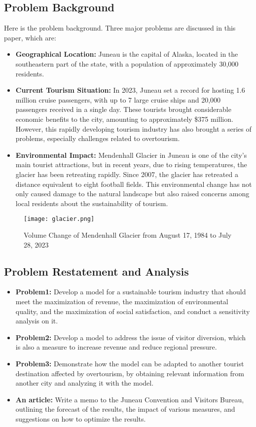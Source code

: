 \documentclass[12pt]{article}  %
\begin{document}
\subsection{Problem Background}
Here is the problem background. Three major problems are discussed in this paper, which are:
\begin{itemize}
    \item \textbf{Geographical Location: }Juneau is the capital of Alaska, located in the southeastern part of the state, with a population of approximately 30,000 residents. 
    \item \textbf{Current Tourism Situation: }In 2023, Juneau set a record for hosting 1.6 million cruise passengers, with up to 7 large cruise ships and 20,000 passengers received in a single day.\cite{1} These tourists brought considerable economic benefits to the city, amounting to approximately \$375 million.\cite{2} However, this rapidly developing tourism industry has also brought a series of problems, especially challenges related to overtourism.
    \item \textbf{Environmental Impact: }Mendenhall Glacier in Juneau is one of the city's main tourist attractions, but in recent years, due to rising temperatures, the glacier has been retreating rapidly. Since 2007, the glacier has retreated a distance equivalent to eight football fields. This environmental change has not only caused damage to the natural landscape but also raised concerns among local residents about the sustainability of tourism.\cite{3}
\end{itemize}

\begin{figure}[H]
	\centering
	\texttt{[image: glacier.png]}
	\caption{Volume Change of Mendenhall Glacier from August 17, 1984 to July 28, 2023}\label{fig:glacier}
\end{figure}

\subsection{Problem Restatement and Analysis}
\begin{itemize}
    \item \textbf{Problem1: }Develop a model for a sustainable tourism industry that should meet the maximization of revenue, the maximization of environmental quality, and the maximization of social satisfaction, and conduct a sensitivity analysis on it.
    \item \textbf{Problem2: }Develop a model to address the issue of visitor diversion, which is also a measure to increase revenue and reduce regional pressure.
    \item \textbf{Problem3: }Demonstrate how the model can be adapted to another tourist destination affected by overtourism, by obtaining relevant information from another city and analyzing it with the model.
    \item \textbf{An article: }Write a memo to the Juneau Convention and Visitors Bureau, outlining the forecast of the results, the impact of various measures, and suggestions on how to optimize the results.
\end{itemize}
\end{document}
